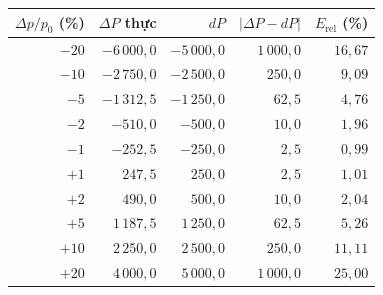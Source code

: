 
\begin{tabular}{@{}rrrrr@{}}
\toprule
$\Delta p/p_0$ (\%) & $\Delta P$ thực & $dP$ & $|\Delta P-dP|$ & $E_{\mathrm{rel}}$ (\%) \\
\midrule
${-}20$ & ${-}6\,000{,}0$ & ${-}5\,000{,}0$ & $1\,000{,}0$ & $16{,}67$ \\
${-}10$ & ${-}2\,750{,}0$ & ${-}2\,500{,}0$ & $250{,}0$ & $9{,}09$ \\
${-}5$ & ${-}1\,312{,}5$ & ${-}1\,250{,}0$ & $62{,}5$ & $4{,}76$ \\
${-}2$ & ${-}510{,}0$ & ${-}500{,}0$ & $10{,}0$ & $1{,}96$ \\
${-}1$ & ${-}252{,}5$ & ${-}250{,}0$ & $2{,}5$ & $0{,}99$ \\
${+}1$ & $247{,}5$ & $250{,}0$ & $2{,}5$ & $1{,}01$ \\
${+}2$ & $490{,}0$ & $500{,}0$ & $10{,}0$ & $2{,}04$ \\
${+}5$ & $1\,187{,}5$ & $1\,250{,}0$ & $62{,}5$ & $5{,}26$ \\
${+}10$ & $2\,250{,}0$ & $2\,500{,}0$ & $250{,}0$ & $11{,}11$ \\
${+}20$ & $4\,000{,}0$ & $5\,000{,}0$ & $1\,000{,}0$ & $25{,}00$ \\
\bottomrule
\end{tabular}
